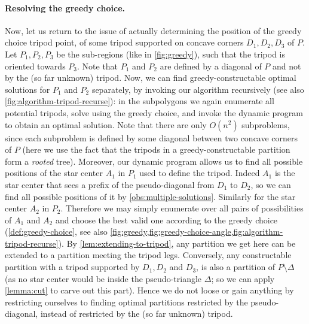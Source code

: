 \documentclass[10pt,a4paper]{article}
\begin{document}
\paragraph{Resolving the greedy choice.}
Now, let us return to the issue of actually determining the position of the greedy choice tripod point, of some tripod supported on concave corners $D_1, D_2, D_3$ of $P$. Let $P_1,P_2,P_3$ be the sub-regions (like in \cref{fig:greedy}), such that the tripod is oriented towards $P_3$. Note that $P_1$ and $P_2$ are defined by a diagonal of $P$ and not by the (so far unknown) tripod.
Now, we can find greedy-constructable optimal solutions for $P_1$ and $P_2$ separately, by invoking our algorithm recursively (see also \cref{fig:algorithm-tripod-recurse}): in the subpolygons we again enumerate all potential tripods, solve using the greedy choice, and invoke the dynamic program to obtain an optimal solution. Note that there are only $O(n^2)$ subproblems, since each subproblem is defined by some diagonal between two concave corners of $P$ (here we use the fact that the tripods in a greedy-constructable partition form a \emph{rooted} tree). Moreover, our dynamic program allows us to find all possible positions of the star center $A_1$ in $P_1$ used to define the tripod. Indeed $A_1$ is the star center that sees a prefix of the pseudo-diagonal from $D_1$ to $D_2$, so we can find all possible positions of it by \cref{obs:multiple-solutions}.
Similarly for the star center $A_2$ in $P_2$. Therefore we may simply enumerate over all pairs of possibilities of $A_1$ and $A_2$ and choose the best valid one according to the greedy choice (\cref{def:greedy-choice}, see also \cref{fig:greedy,fig:greedy-choice-angle,fig:algorithm-tripod-recurse}).
By \cref{lem:extending-to-tripod}, any partition we get here can be extended to a partition meeting the tripod legs. 
Conversely, any constructable partition with a tripod supported by $D_1, D_2$ and $D_3$, is also a partition of $P\setminus \Delta$ (as no star center would be inside the pseudo-triangle $\Delta$; so we can apply \cref{lemma:cut} to carve out this part). Hence we do not loose or gain anything by restricting ourselves to finding optimal partitions restricted by the pseudo-diagonal, instead of restricted by the (so far unknown) tripod.

\end{document}
